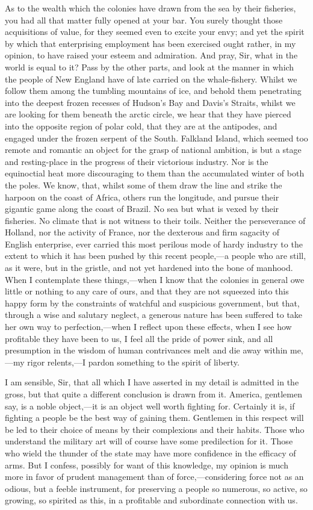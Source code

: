 As to the wealth which the colonies have drawn from the sea by their fisheries, you had all that matter fully opened at your bar. You surely thought those acquisitions of value, for they seemed even to excite your envy; and yet the spirit by which that enterprising employment has been exercised ought rather, in my opinion, to have raised your esteem and admiration. And pray, Sir, what in the world is equal to it? Pass by the other parts, and look at the manner in which the people of New England have of late carried on the whale-fishery. Whilst we follow them among the tumbling mountains of ice, and behold them penetrating into the deepest frozen recesses of Hudson's Bay and Davis's Straits, whilst we are looking for them beneath the arctic circle, we hear that they have pierced into the opposite region of polar cold, that they are at the antipodes, and engaged under the frozen serpent of the South. Falkland Island, which seemed too remote and romantic an object for the grasp of national ambition, is but a stage and resting-place in the progress of their victorious industry. Nor is the equinoctial heat more discouraging to them than the accumulated winter of both the poles. We know, that, whilst some of them draw the line and strike the harpoon on the coast of Africa, others run the longitude, and pursue their gigantic game along the coast of Brazil. No sea but what is vexed by their fisheries. No climate that is not witness to their toils. Neither the perseverance of Holland, nor the activity of France, nor the dexterous and firm sagacity of English enterprise, ever carried this most perilous mode of hardy industry to the extent to which it has been pushed by this recent people,—a people who are still, as it were, but in the gristle, and not yet hardened into the bone of manhood. When I contemplate these things,—when I know that the colonies in general owe little or nothing to any care of ours, and that they are not squeezed into this happy form by the constraints of watchful and suspicious government, but that, through a wise and salutary neglect, a generous nature has been suffered to take her own way to perfection,—when I reflect upon these effects, when I see how profitable they have been to us, I feel all the pride of power sink, and all presumption in the wisdom of human contrivances melt and die away within me,—my rigor relents,—I pardon something to the spirit of liberty.

I am sensible, Sir, that all which I have asserted in my detail is admitted in the gross, but that quite a different conclusion is drawn from it. America, gentlemen say, is a noble object,—it is an object well worth fighting for. Certainly it is, if fighting a people be the best way of gaining them. Gentlemen in this respect will be led to their choice of means by their complexions and their habits. Those who understand the military art will of course have some predilection for it. Those who wield the thunder of the state may have more confidence in the efficacy of arms. But I confess, possibly for want of this knowledge, my opinion is much more in favor of prudent management than of force,—considering force not as an odious, but a feeble instrument, for preserving a people so numerous, so active, so growing, so spirited as this, in a profitable and subordinate connection with us.

